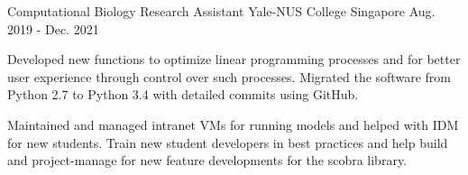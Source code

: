 \begin{cventries}
  \cventry
    {Computational Biology Research Assistant} %
    {Yale-NUS College} %
    {Singapore} %
    {Aug. 2019 - Dec. 2021} %
    {
      \begin{cvitems} %
        \item {Developed new functions to optimize linear programming processes and for better user experience through control over such processes. Migrated the software from Python 2.7 to Python 3.4 with detailed commits using GitHub.}
        \item {Maintained and managed intranet VMs for running models and helped with IDM for new students.  Train new student developers in best practices and help build and project-manage for new feature developments for the scobra library.}
      \end{cvitems}
    }
\end{cventries}
